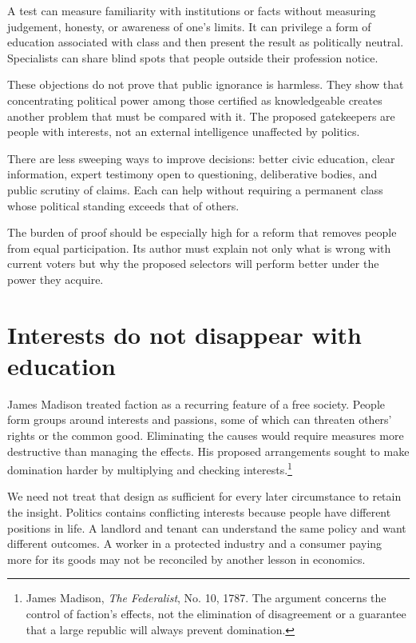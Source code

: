 \documentclass[12pt,a4paper]{book}
\begin{document}
A test can measure familiarity with institutions or facts without measuring judgement, honesty, or awareness of one's limits. It can privilege a form of education associated with class and then present the result as politically neutral. Specialists can share blind spots that people outside their profession notice.

These objections do not prove that public ignorance is harmless. They show that concentrating political power among those certified as knowledgeable creates another problem that must be compared with it. The proposed gatekeepers are people with interests, not an external intelligence unaffected by politics.

There are less sweeping ways to improve decisions: better civic education, clear information, expert testimony open to questioning, deliberative bodies, and public scrutiny of claims. Each can help without requiring a permanent class whose political standing exceeds that of others.

The burden of proof should be especially high for a reform that removes people from equal participation. Its author must explain not only what is wrong with current voters but why the proposed selectors will perform better under the power they acquire.

\section*{Interests do not disappear with education}

James Madison treated faction as a recurring feature of a free society. People form groups around interests and passions, some of which can threaten others' rights or the common good. Eliminating the causes would require measures more destructive than managing the effects. His proposed arrangements sought to make domination harder by multiplying and checking interests.\footnote{James Madison, \emph{The Federalist}, No. 10, 1787. The argument concerns the control of faction's effects, not the elimination of disagreement or a guarantee that a large republic will always prevent domination.}

We need not treat that design as sufficient for every later circumstance to retain the insight. Politics contains conflicting interests because people have different positions in life. A landlord and tenant can understand the same policy and want different outcomes. A worker in a protected industry and a consumer paying more for its goods may not be reconciled by another lesson in economics.
\end{document}
